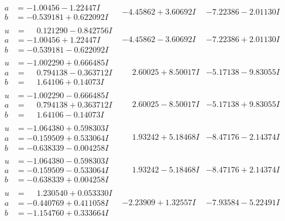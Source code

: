 \documentclass[1p]{elsarticle_modified}
\theoremstyle{definition}
\begin{document}
$$\begin{array}{c|c|c}
\begin{aligned}
a &= -1.00456 - 1.22447 I \\
b &= -0.539181 + 0.622092 I\end{aligned}
 & -4.45862 + 3.60692 I & -7.22386 - 2.01130 I \\ \hline\begin{aligned}
u &= \phantom{-}0.121290 - 0.842756 I \\
a &= -1.00456 + 1.22447 I \\
b &= -0.539181 - 0.622092 I\end{aligned}
 & -4.45862 - 3.60692 I & -7.22386 + 2.01130 I \\ \hline\begin{aligned}
u &= -1.002290 + 0.666485 I \\
a &= \phantom{-}0.794138 - 0.363712 I \\
b &= \phantom{-}1.64106 + 0.14073 I\end{aligned}
 & \phantom{-}2.60025 + 8.50017 I & -5.17138 - 9.83055 I \\ \hline\begin{aligned}
u &= -1.002290 - 0.666485 I \\
a &= \phantom{-}0.794138 + 0.363712 I \\
b &= \phantom{-}1.64106 - 0.14073 I\end{aligned}
 & \phantom{-}2.60025 - 8.50017 I & -5.17138 + 9.83055 I \\ \hline\begin{aligned}
u &= -1.064380 + 0.598303 I \\
a &= -0.159509 + 0.533064 I \\
b &= -0.638339 - 0.004258 I\end{aligned}
 & \phantom{-}1.93242 + 5.18468 I & -8.47176 - 2.14374 I \\ \hline\begin{aligned}
u &= -1.064380 - 0.598303 I \\
a &= -0.159509 - 0.533064 I \\
b &= -0.638339 + 0.004258 I\end{aligned}
 & \phantom{-}1.93242 - 5.18468 I & -8.47176 + 2.14374 I \\ \hline\begin{aligned}
u &= \phantom{-}1.230540 + 0.053330 I \\
a &= -0.440769 + 0.411058 I \\
b &= -1.154760 + 0.333664 I\end{aligned}
 & -2.23909 + 1.32557 I & -7.93584 - 5.22491 I \\ \hline\begin{aligned}

\end{aligned}
\end{array}$$
\end{document}
